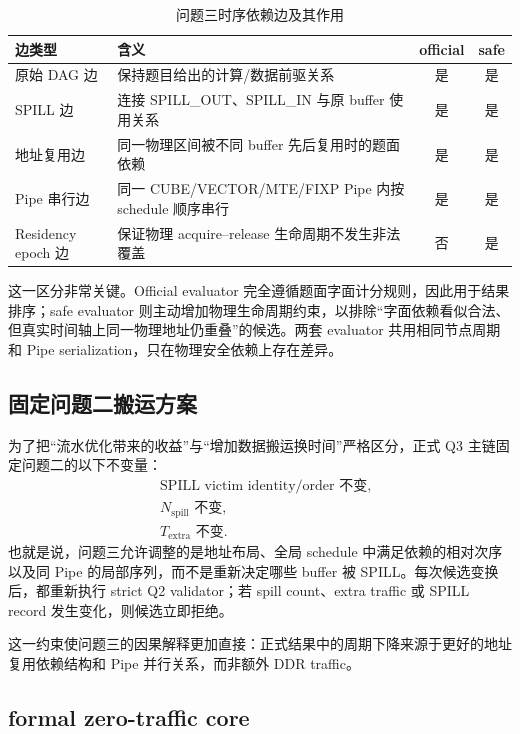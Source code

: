 \begin{table}[H]
\centering
\caption{问题三时序依赖边及其作用}
\label{tab:q3-edge-types}
\begin{tabular}{p{2.6cm}p{7.2cm}cc}
\toprule
边类型 & 含义 & official & safe \\
\midrule
原始 DAG 边 & 保持题目给出的计算/数据前驱关系 & 是 & 是 \\
SPILL 边 & 连接 SPILL\_OUT、SPILL\_IN 与原 buffer 使用关系 & 是 & 是 \\
地址复用边 & 同一物理区间被不同 buffer 先后复用时的题面依赖 & 是 & 是 \\
Pipe 串行边 & 同一 CUBE/VECTOR/MTE/FIXP Pipe 内按 schedule 顺序串行 & 是 & 是 \\
Residency epoch 边 & 保证物理 acquire--release 生命周期不发生非法覆盖 & 否 & 是 \\
\bottomrule
\end{tabular}
\end{table}

这一区分非常关键。Official evaluator 完全遵循题面字面计分规则，因此用于结果排序；safe evaluator 则主动增加物理生命周期约束，以排除“字面依赖看似合法、但真实时间轴上同一物理地址仍重叠”的候选。两套 evaluator 共用相同节点周期和 Pipe serialization，只在物理安全依赖上存在差异。

\subsection{固定问题二搬运方案}

为了把“流水优化带来的收益”与“增加数据搬运换时间”严格区分，正式 Q3 主链固定问题二的以下不变量：
\begin{align}
&\text{SPILL victim identity/order 不变},\\
&N_{\mathrm{spill}}\text{ 不变},\\
&T_{\mathrm{extra}}\text{ 不变}.
\end{align}
也就是说，问题三允许调整的是地址布局、全局 schedule 中满足依赖的相对次序以及同 Pipe 的局部序列，而不是重新决定哪些 buffer 被 SPILL。每次候选变换后，都重新执行 strict Q2 validator；若 spill count、extra traffic 或 SPILL record 发生变化，则候选立即拒绝。

这一约束使问题三的因果解释更加直接：正式结果中的周期下降来源于更好的地址复用依赖结构和 Pipe 并行关系，而非额外 DDR traffic。

\subsection{formal zero-traffic core}

